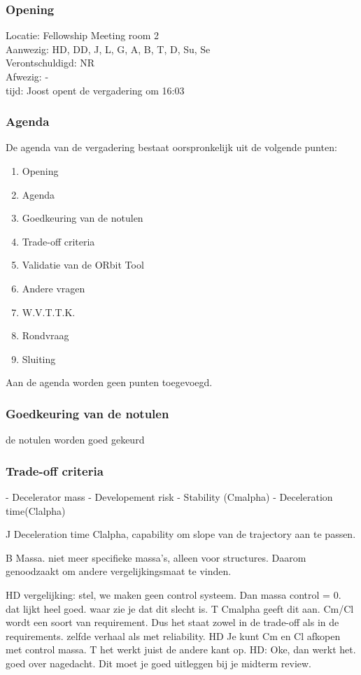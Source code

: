 \subsubsection{Opening}
Locatie: Fellowship Meeting room 2\\
Aanwezig: HD, DD, J, L, G, A, B, T, D, Su, Se\\
Verontschuldigd: NR \\
Afwezig: - \\
tijd: Joost opent de vergadering om 16:03\\

\subsubsection{Agenda}
De agenda van de vergadering bestaat oorspronkelijk uit de volgende punten:
\begin{enumerate}
\item Opening
\item Agenda
\item Goedkeuring van de notulen
\item Trade-off criteria
\item Validatie van de ORbit Tool
\item Andere vragen
\item W.V.T.T.K.
\item Rondvraag
\item Sluiting
\end{enumerate}

Aan de agenda worden geen punten toegevoegd.

\subsubsection{Goedkeuring van de notulen}
de notulen worden goed gekeurd

\subsubsection{Trade-off criteria}
- Decelerator mass
- Developement risk
- Stability (Cmalpha)
- Deceleration time(Clalpha)

J Deceleration time Clalpha, capability om slope van de trajectory aan te passen. 

B Massa. niet meer specifieke massa's, alleen voor structures. Daarom genoodzaakt om andere vergelijkingsmaat te vinden. 

HD vergelijking: stel, we maken geen control systeem. Dan massa control = 0. dat lijkt heel goed. waar zie je dat dit slecht is. T Cmalpha geeft dit aan. Cm/Cl wordt een soort van requirement. Dus het staat zowel in de trade-off als in de requirements. zelfde verhaal als met reliability. HD Je kunt Cm en Cl afkopen met control massa. T het werkt juist de andere kant op. HD: Oke, dan werkt het. goed over nagedacht. Dit moet je goed uitleggen bij je midterm review. 

